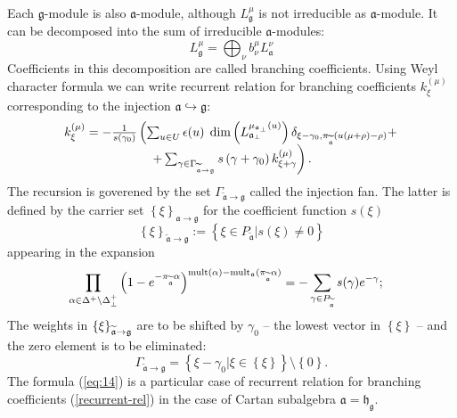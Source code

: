 \documentclass[preprint,12pt]{elsarticle}
\newcommand{\gf}{\mathfrak{g}}
\newcommand{\af}{\mathfrak{a}}
\newcommand{\afb}{\mathfrak{a}_{\bot}}
\newcommand{\hf}{\mathfrak{h}}
\newcommand{\hfg}{\hf_{\gf}}
\begin{document}
Each $\gf$-module is also $\af$-module, although $L^{\mu}_{\gf}$ is not irreducible as $\af$-module. It can be decomposed into the sum of irreducible $\af$-modules:
\begin{equation}
  \label{eq:16}
  L^{\mu}_{\gf}=\bigoplus_{\nu}b^{\mu}_{\nu}L^{\nu}_{\af}
\end{equation}
Coefficients in this decomposition are called branching coefficients. 
Using Weyl character formula we can write recurrent relation \cite{2010arXiv1007.0318L} for branching coefficients $k_{\xi
}^{\left( \mu \right) }$ corresponding to the injection $\af\hookrightarrow \gf$:
\begin{equation}
\begin{array}{c}
k_{\xi }^{\left( \mu \right) }=-\frac{1}{s\left( \gamma _{0}\right) }\left(
\sum_{u\in U}\epsilon (u)\;\dim \left( L_{\afb}^{\mu _{\af%
_{\perp }}\left( u\right) }\right) \delta _{\xi -\gamma _{0},\pi _{%
\widetilde{\af}}(u(\mu +\rho )-\rho )}+\right.  \\
\left. +\sum_{\gamma \in \Gamma _{\widetilde{\af}\rightarrow \gf%
}}s\left( \gamma +\gamma _{0}\right) k_{\xi +\gamma }^{\left( \mu \right)
}\right) .
\end{array}
\label{recurrent-rel}
\end{equation}
The recursion is goverened by the set $\Gamma _{\widetilde{\af}\rightarrow \gf}$ called the injection fan. The latter is defined by the
carrier set $\left\{ \xi \right\} _{\af\rightarrow \gf}$ for the
coefficient function $s(\xi )$
\begin{equation*}
\left\{ \xi \right\} _{\widetilde{\af}\rightarrow \gf}:=\left\{
\xi \in P_{\widetilde{\af}}|s(\xi )\neq 0\right\}
\end{equation*}
appearing in the expansion
\begin{equation}
\prod_{\alpha \in \Delta ^{+}\setminus \Delta _{\bot }^{+}}\left( 1-e^{-\pi
_{\widetilde{\af}}\alpha }\right) ^{\mathrm{mult}(\alpha )-\mathrm{mult}%
_{\af}(\pi _{\widetilde{\af}}\alpha )}=-\sum_{\gamma \in P_{%
\widetilde{\af}}}s(\gamma )e^{-\gamma };\quad
\end{equation}
The weights in $\left\{ \xi \right\} _{\widetilde{\af}\rightarrow \frak{%
g}}$ are to be shifted by $\gamma _{0}$ -- the lowest vector in $\left\{ \xi
\right\} $ -- and the zero element is to be eliminated:
\begin{equation}
\Gamma _{\widetilde{\af}\rightarrow \gf}=\left\{ \xi -\gamma
_{0}|\xi \in \left\{ \xi \right\} \right\} \setminus \left\{ 0\right\} .
\end{equation}
The formula (\ref{eq:14}) is a particular case of recurrent relation for branching coefficients (\ref{recurrent-rel}) in the case of Cartan subalgebra $\af=\hfg$.
\end{document}
